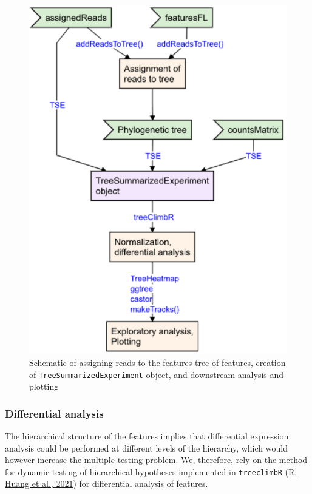 \documentclass[12pt,twoside]{reedthesis}
\begin{document}
\begin{figure}[htbp]

{\centering \includegraphics{thesis_files/figure-latex/3f12-1} 

}

\caption{Schematic of assigning reads to the features tree of
features, creation of \texttt{TreeSummarizedExperiment} object, and downstream
analysis and plotting}\label{fig:3f12}
\end{figure}
\hypertarget{differential-analysis}{%
\subsubsection{Differential analysis}\label{differential-analysis}}

The hierarchical structure of the features implies that differential
expression analysis could be performed at different levels of the
hierarchy, which would however increase the multiple testing problem.
We, therefore, rely on the method for dynamic testing of hierarchical
hypotheses implemented in \texttt{treeclimbR} (\protect\hyperlink{ref-huang2021}{R. Huang et al., 2021}) for differential
analysis of features.
\end{document}
